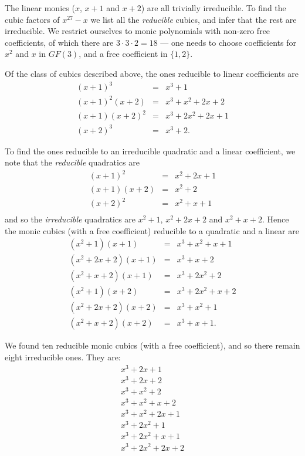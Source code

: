 \documentclass[11pt]{article} \usepackage{amssymb}
\begin{document}
\begin{enumerate}
\begin{enumerate}
    The linear monics ($x$, $x+1$ and $x+2$) are all
    trivially irreducible. To find the cubic factors of $x^{27}-x$ we list all 
    the {\em reducible} cubics, and infer that the rest are irreducible. 
    We restrict
    ourselves to monic polynomials with non-zero free coefficients, of which
    there are $3 \cdot 3 \cdot 2=18$ --- one needs to choose coefficients 
    for $x^2$ and $x$ in $GF(3)$, and a free coefficient in $\{1,2\}$.
    
    Of the class of cubics described above, the ones reducible to linear
    coefficients are
    \begin{eqnarray*}
      (x + 1)^3 &=& x^3 + 1\\
      (x + 1)^2(x + 2) &=& x^3 + x^2 + 2x + 2\\
      (x + 1)(x + 2)^2 &=& x^3 + 2x^2 + 2x + 1\\
      (x + 2)^3 &=& x^3 + 2.
    \end{eqnarray*}

    To find the ones reducible to an irreducible quadratic and a linear 
    coefficient, we note that the {\em reducible} quadratics are
    \begin{eqnarray*}
      (x+1)^2 &=& x^2+2x+1\\
      (x+1)(x+2) &=& x^2+2\\
      (x+2)^2 &=& x^2+x+1\\
    \end{eqnarray*}
    and so the {\em irreducible} quadratics are  $x^2+1$, $x^2+2x+2$ and 
    $x^2+x+2$. Hence the monic cubics (with a free coefficient) reducible to a 
    quadratic and a linear are
    \begin{eqnarray*}
      (x^2 + 1)(x + 1) &=& x^3 + x^2 + x + 1\\
      (x^2 + 2x + 2)(x + 1) &=& x^3 + x + 2\\
      (x^2 + x + 2)(x + 1) &=& x^3 + 2x^2 + 2\\
      (x^2 + 1)(x + 2) &=& x^3 + 2x^2 + x + 2\\
      (x^2 + 2x + 2)(x + 2) &=& x^3 + x^2 + 1\\
      (x^2 + x + 2)(x + 2) &=& x^3 + x + 1.
    \end{eqnarray*}

    We found ten reducible monic cubics (with a free coefficient), and so
    there remain eight irreducible ones. They are:
    \begin{eqnarray*}
      x^3 + 2x + 1\\
      x^3 + 2x + 2\\
      x^3 + x^2 + 2\\
      x^3 + x^2 + x + 2\\
      x^3 + x^2 + 2x + 1\\
      x^3 + 2x^2 + 1\\
      x^3 + 2x^2 + x + 1\\
      x^3 + 2x^2 + 2x + 2\\
    \end{eqnarray*}


\end{enumerate}
\end{enumerate}
\end{document}
